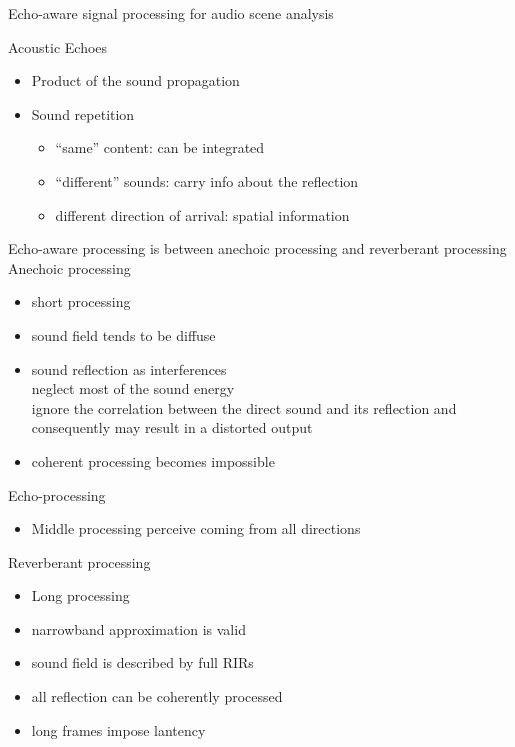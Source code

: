 \begin{frame}{\alert{Echo-aware} signal processing for audio scene analysis}

    \begin{mydefblock}{Acoustic Echoes}
        \begin{itemize}
            \item Product of the sound propagation
            \item Sound repetition
            \begin{itemize}
                \item ``same'' content: can be integrated
                \item ``different'' sounds: carry info about the reflection
                \item different direction of arrival: spatial information
            \end{itemize}
        \end{itemize}
    \end{mydefblock}

    \begin{block}{Echo-aware processing}
        is between anechoic processing and reverberant processing
        \\Anechoic processing
        \begin{itemize}
            \item short processing
            \item[\cmark] sound field tends to be diffuse
            \item[\xmark] sound reflection as interferences
            \\neglect most of the sound energy
            \\ignore the correlation between the direct sound and its reflection and consequently may result in a distorted output
            \item[\xmark] coherent processing becomes impossible
        \end{itemize}
        Echo-processing
        \begin{itemize}
            \item Middle processing
            perceive coming from all directions~\cite{daldegan1988}
        \end{itemize}
        Reverberant processing
        \begin{itemize}
            \item Long processing
            \item[\cmark] narrowband approximation is valid
            \item[\cmark] sound field is described by full RIRs
            \item[\cmark] all reflection can be \alert{coherently} processed
            \item[\xmark] long frames impose lantency
        \end{itemize}
    \end{block}

\end{frame}

